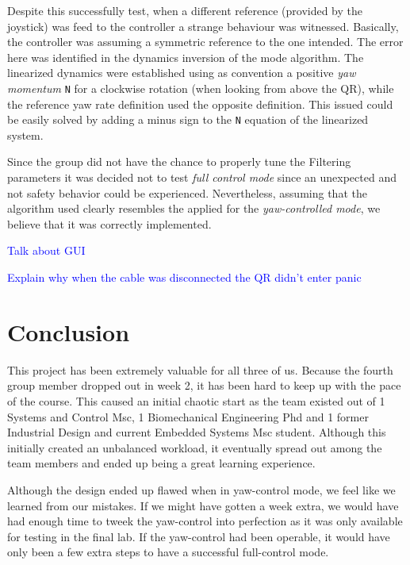 \documentclass{article}
\newcommand\todo[1]{\textcolor{blue}{#1}} %
\begin{document}
Despite this successfully test, when a different reference (provided by the joystick) was feed to the controller a strange behaviour was witnessed. Basically, the controller was assuming a symmetric reference to the one intended. The error here was identified in the dynamics inversion of the mode algorithm. The linearized dynamics were established using as convention a positive \textit{yaw momentum} \texttt{N} for a clockwise rotation (when looking from above the QR), while the reference yaw rate definition used the opposite definition. This issued could be easily solved by adding a minus sign to the \texttt{N} equation of the linearized system.

Since the group did not have the chance to properly tune the Filtering parameters it was decided not to test \textit{full control mode} since an unexpected and not safety behavior could be experienced. Nevertheless, assuming that the algorithm used clearly resembles the applied for the \textit{yaw-controlled mode}, we believe that it was correctly implemented.

\todo{Talk about GUI\\}


\todo{Explain why when the cable was disconnected the QR didn't enter panic} 




\section{Conclusion}
\label{sec:conclusion}

This project has been extremely valuable for all three of us. Because the fourth group member dropped out in week 2, it has been hard to keep up with the pace of the course. This caused an initial chaotic start as the team existed out of 1 Systems and Control Msc, 1 Biomechanical Engineering Phd and 1 former Industrial Design and current Embedded Systems Msc student. Although this initially created an unbalanced workload, it eventually spread out among the team members and ended up being a great learning experience. 

Although the design ended up flawed when in yaw-control mode, we feel like we learned from our mistakes. If we might have gotten a week extra, we would have had enough time to tweek the yaw-control into perfection as it was only available for testing in the final lab. If the yaw-control had been operable, it would have only been a few extra steps to have a successful full-control mode. 
\end{document}
